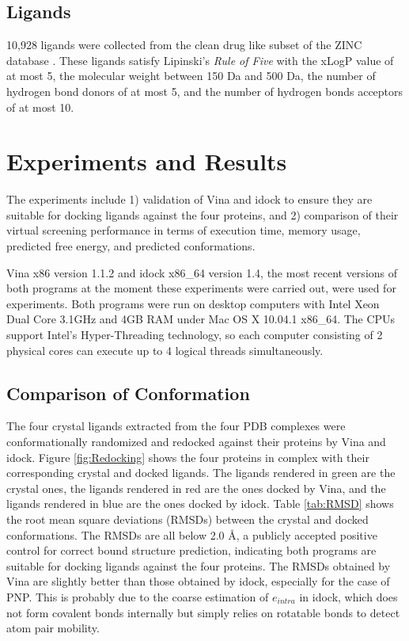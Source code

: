 \documentclass[10pt,conference,compsocconf]{../IEEEtran}
\begin{document}
\subsection{Ligands}

10,928 ligands were collected from the clean drug like subset of the ZINC database \cite{532}. These ligands satisfy Lipinski's \textit{Rule of Five} \cite{169} with the xLogP value of at most 5, the molecular weight between 150 Da and 500 Da, the number of hydrogen bond donors of at most 5, and the number of hydrogen bonds acceptors of at most 10.

\section{Experiments and Results}

The experiments include 1) validation of Vina and idock to ensure they are suitable for docking ligands against the four proteins, and 2) comparison of their virtual screening performance in terms of execution time, memory usage, predicted free energy, and predicted conformations.

Vina x86 version 1.1.2 and idock x86\_64 version 1.4, the most recent versions of both programs at the moment these experiments were carried out, were used for experiments. Both programs were run on desktop computers with Intel Xeon Dual Core 3.1GHz and 4GB RAM under Mac OS X 10.04.1 x86\_64. The CPUs support Intel's Hyper-Threading technology, so each computer consisting of 2 physical cores can execute up to 4 logical threads simultaneously.

\subsection{Comparison of Conformation}

The four crystal ligands extracted from the four PDB complexes were conformationally randomized and redocked against their proteins by Vina and idock. Figure \ref{fig:Redocking} shows the four proteins in complex with their corresponding crystal and docked ligands. The ligands rendered in green are the crystal ones, the ligands rendered in red are the ones docked by Vina, and the ligands rendered in blue are the ones docked by idock. Table \ref{tab:RMSD} shows the root mean square deviations (RMSDs) between the crystal and docked conformations. The RMSDs are all below 2.0 \AA, a publicly accepted positive control for correct bound structure prediction, indicating both programs are suitable for docking ligands against the four proteins. The RMSDs obtained by Vina are slightly better than those obtained by idock, especially for the case of PNP. This is probably due to the coarse estimation of $e_{intra}$ in idock, which does not form covalent bonds internally but simply relies on rotatable bonds to detect atom pair mobility.
\end{document}

